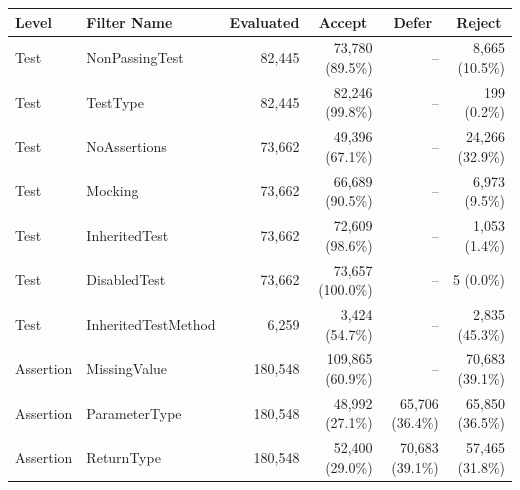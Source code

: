   \renewcommand{\theHreporttablerow}{tab-exclusions-filtering-extended.\arabic{reporttablerow}}
  \setcounter{reporttablerow}{0}
  \begin{tabular}{llrrrr}
  \toprule
  Level & Filter Name & Evaluated & \multicolumn{1}{c}{Accept} & \multicolumn{1}{c}{Defer} & \multicolumn{1}{c}{Reject} \\
  \midrule
  {reporttablerow}\label{tabrow:tab-exclusions-filtering-extended:Test@3ANonPassingTest}Test & NonPassingTest & 82,445 & 73,780\; (\phantom{0}89.5\%) & -- & 8,665\; (10.5\%) \\
  {reporttablerow}\label{tabrow:tab-exclusions-filtering-extended:Test@3ATestType}Test & TestType & 82,445 & 82,246\; (\phantom{0}99.8\%) & -- & 199\; (\phantom{0}0.2\%) \\
  {reporttablerow}\label{tabrow:tab-exclusions-filtering-extended:Test@3ANoAssertions}Test & NoAssertions & 73,662 & 49,396\; (\phantom{0}67.1\%) & -- & 24,266\; (32.9\%) \\
  {reporttablerow}\label{tabrow:tab-exclusions-filtering-extended:Test@3AMocking}Test & Mocking & 73,662 & 66,689\; (\phantom{0}90.5\%) & -- & 6,973\; (\phantom{0}9.5\%) \\
  {reporttablerow}\label{tabrow:tab-exclusions-filtering-extended:Test@3AInheritedTest}Test & InheritedTest & 73,662 & 72,609\; (\phantom{0}98.6\%) & -- & 1,053\; (\phantom{0}1.4\%) \\
  {reporttablerow}\label{tabrow:tab-exclusions-filtering-extended:Test@3ADisabledTest}Test & DisabledTest & 73,662 & 73,657\; (100.0\%) & -- & 5\; (\phantom{0}0.0\%) \\
  {reporttablerow}\label{tabrow:tab-exclusions-filtering-extended:Test@3AInheritedTestMethod}Test & InheritedTestMethod & 6,259 & 3,424\; (\phantom{0}54.7\%) & -- & 2,835\; (45.3\%) \\
  \midrule
  {reporttablerow}\label{tabrow:tab-exclusions-filtering-extended:Assertion@3AMissingValue}Assertion & MissingValue & 180,548 & 109,865\; (\phantom{0}60.9\%) & -- & 70,683\; (39.1\%) \\
  {reporttablerow}\label{tabrow:tab-exclusions-filtering-extended:Assertion@3AParameterType}Assertion & ParameterType & 180,548 & 48,992\; (\phantom{0}27.1\%) & 65,706\; (36.4\%) & 65,850\; (36.5\%) \\
  {reporttablerow}\label{tabrow:tab-exclusions-filtering-extended:Assertion@3AReturnType}Assertion & ReturnType & 180,548 & 52,400\; (\phantom{0}29.0\%) & 70,683\; (39.1\%) & 57,465\; (31.8\%) \\

\end{tabular}
